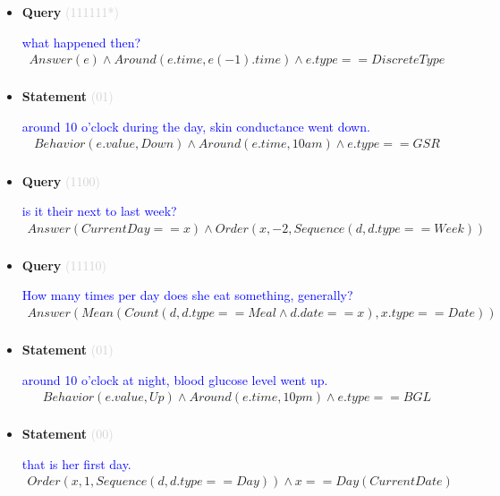 \documentclass[11pt]{article}
\newcommand{\key}[1]{\textcolor{lightgray}{#1}}
\newcounter{CQuery}
\newcounter{CStatement}
\begin{document}
\begin{itemize}
\item
\textbf{Query\theCQuery} \key{(111111*)} \addtocounter{CQuery}{1}
\textcolor{blue}{ what happened then? }
\begin{multline*}
Answer(e) \wedge Around(e.time, e(-1).time) \wedge e.type==DiscreteType \\ 
\end{multline*}


\item
\textbf{Statement\theCStatement} \key{(01)} \addtocounter{CStatement}{1}
\textcolor{blue}{ around 10 o'clock during the day, skin conductance went down. }
\begin{multline*}
Behavior(e.value, Down) \wedge Around(e.time, 10am) \wedge e.type==GSR \\ 
\end{multline*}


\item
\textbf{Query\theCQuery} \key{(1100)} \addtocounter{CQuery}{1}
\textcolor{blue}{ is it their next to last week? }
\begin{multline*}
Answer(CurrentDay==x) \wedge Order(x, -2, Sequence(d, d.type==Week)) \\ 
\end{multline*}


\item
\textbf{Query\theCQuery} \key{(11110)} \addtocounter{CQuery}{1}
\textcolor{blue}{ How many times per day does she eat something, generally? }
\begin{multline*}
Answer(Mean(Count(d, d.type==Meal \wedge d.date==x), x.type==Date)) \\ 
\end{multline*}


\item
\textbf{Statement\theCStatement} \key{(01)} \addtocounter{CStatement}{1}
\textcolor{blue}{ around 10 o'clock at night, blood glucose level went up. }
\begin{multline*}
Behavior(e.value, Up) \wedge Around(e.time, 10pm) \wedge e.type==BGL \\ 
\end{multline*}


\item
\textbf{Statement\theCStatement} \key{(00)} \addtocounter{CStatement}{1}
\textcolor{blue}{ that is her first day. }
\begin{multline*}
Order(x, 1, Sequence(d, d.type==Day)) \wedge x==Day(CurrentDate) \\ 
\end{multline*}



\end{itemize}
\end{document}
